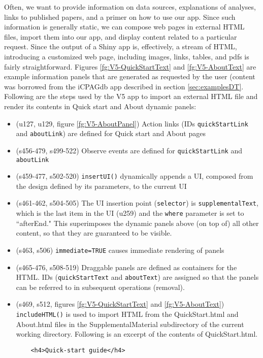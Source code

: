 \documentclass[10pt, letterpaper]{article}
\begin{document}
\begin{spacing}{1.0}
Often, we want to provide information on data sources, explanations of analyses, links to published papers, and a primer on how to use our app.  Since such information is generally static, we can compose web pages in external HTML files, import them into our app, and display content related to a particular request.  Since the output of a Shiny app is, effectively, a stream of HTML, introducing a customized web page, including images, links, tables, and pdfs is fairly straightforward.  Figures \ref{fg:V5-QuickStartText} and \ref{fg:V5-AboutText} are example information panels that are generated as requested by the user (content was borrowed from the iCPAGdb app described in section \ref{sec:examplesDT}.  Following are the steps used by the V5 app to import an external HTML file and render its contents in Quick start and About dynamic panels: 

\begin{itemize}
    \item (u127, u129, figure \ref{fg:V5-AboutPanel}) Action links (IDs \texttt{quickStartLink} and \texttt{aboutLink}) are defined for Quick start and About pages
    \item (s456-479, s499-522) Observe events are defined for \texttt{quickStartLink} and \texttt{aboutLink}
    \item (s459-477, s502-520) \texttt{insertUI()} dynamically appends a UI, composed from the design defined by its parameters, to the current UI
    \item (s461-462, s504-505) The UI insertion point (\texttt{selector}) is \texttt{supplementalText}, which is the last item in the UI (u259) and the \texttt{where} parameter is set to ``afterEnd."  This superimposes the  dynamic panels above (on top of) all other content, so that they are guaranteed to be visible.
    \item (s463, s506) \texttt{immediate=TRUE} causes immediate rendering of panels
    \item (s465-476, s508-519) Draggable panels are defined as containers for the HTML.  IDs (\texttt{quickStartText} and \texttt{aboutText}) are assigned so that the panels can be referred to in subsequent operations (removal).
    \item (s469, s512, figures \ref{fg:V5-QuickStartText} and \ref{fg:V5-AboutText}) \texttt{includeHTML()} is used to import HTML from the QuickStart.html and About.html files in the SupplementalMaterial subdirectory of the current working directory.  Following is an excerpt of the contents of QuickStart.html.\\
    \footnotesize
    \begin{verbatim}
    <h4>Quick-start guide</h4>
    

\end{verbatim}
\end{itemize}
\end{spacing}
\end{document}
